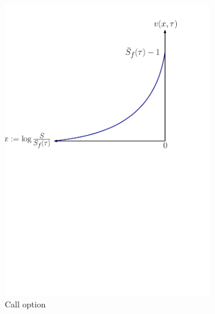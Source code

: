 \begin{figure}[H]
  \centering
  \begin{subfigure}{0.265\textheight}
    \centering
    \includegraphics[width=\textwidth]{chapters/chapter2/CompanyCallOption.pdf}
    \caption{Call option}
    \label{fig:blackscholes:frontfixingmethod:company_call_value_vs_curve}
  \end{subfigure}
  \begin{subfigure}{0.305\textheight}
    \centering

\end{subfigure}
\end{figure}
